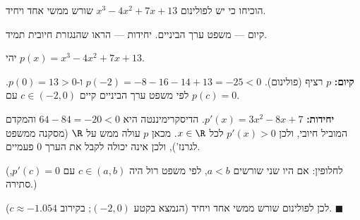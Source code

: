 
\begin{question}
הוכיחו כי יש לפולינום $x^3-4x^2+7x+13$ שורש ממשי אחד ויחיד.
\end{question}

\begin{hint}
קיום — משפט ערך הביניים. יחידות — הראו שהנגזרת חיובית תמיד.
\end{hint}

\begin{solution}
יהי $p(x)=x^3-4x^2+7x+13$.

\textbf{קיום:} $p$ רציף (פולינום). $p(-2)=-8-16-14+13=-25<0$ ו-$p(0)=13>0$. לפי משפט ערך הביניים קיים $c\in(-2,0)$ עם $p(c)=0$.

\textbf{יחידות:} $p'(x)=3x^2-8x+7$. הדיסקרימיננטה היא $64-84=-20<0$ והמקדם המוביל חיובי, ולכן $p'(x)>0$ לכל $x\in\R$. מכאן $p$ עולה ממש על $\R$ (מסקנה ממשפט לגרנז'), ולכן אינה יכולה לקבל את הערך $0$ פעמיים.

(לחלופין: אם היו שני שורשים $a<b$, לפי משפט רול היה $c\in(a,b)$ עם $p'(c)=0$, סתירה.)

לכן לפולינום שורש ממשי אחד ויחיד (הנמצא בקטע $(-2,0)$; בקירוב $c\approx-1.054$). $\blacksquare$
\end{solution}
